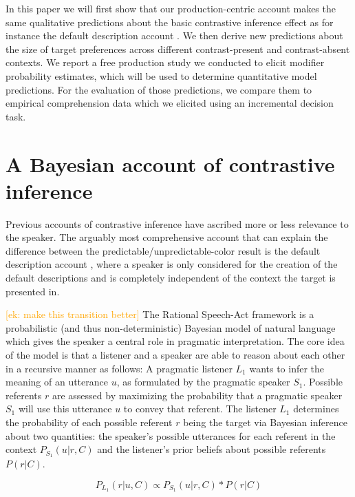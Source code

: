 \documentclass[10pt,letterpaper]{article}
\newcommand{\ek}[1]{\textcolor{Orange}{[ek: #1]}}
\begin{document}
In this paper we will first show that our production-centric account makes the same qualitative predictions about the basic contrastive inference effect as for instance the default description account \cite{Sedivy:2003}. We then derive new predictions about the size of target preferences across different contrast-present and contrast-absent contexts. We report a free production study we conducted to elicit modifier probability estimates, which will be used to determine quantitative model predictions. For the evaluation of those predictions, we compare them to empirical comprehension data which we elicited using an incremental decision task.


\section{A Bayesian account of contrastive inference}

Previous accounts of contrastive inference have ascribed more or less relevance to the speaker. The arguably most comprehensive account that can explain the difference between the predictable/unpredictable-color result is the default description account \cite{Sedivy:1999}, where a speaker is only considered for the creation of the default descriptions and is completely independent of the context the target is presented in. 

\ek{make this transition better}
The Rational Speech-Act framework \cite{Frank:2012,Goodman:2016} is a probabilistic (and thus non-deterministic) Bayesian model of natural language which gives the speaker a central role in pragmatic interpretation. The core idea of the model is that a listener and a speaker are able to reason about each other in a recursive manner as follows: A pragmatic listener $L_1$ wants to infer the meaning of an utterance $u$, as formulated by the pragmatic speaker $S_1$. Possible referents $r$ are assessed by maximizing the probability that a pragmatic speaker $S_1$ will use this utterance $u$ to convey that referent.
The listener $L_1$ determines the probability of each possible referent $r$ being the target via Bayesian inference about two quantities: the speaker's possible utterances for each referent in the context $P_{S_1}(u|r,C)$ and the listener's prior beliefs about possible referents $P(r|C)$. 

\begin{equation}
	P_{L_1}(r|u,C) \propto P_{S_1}(u|r,C) * P(r|C)
\label{eq-prior}
\end{equation}
\end{document}
